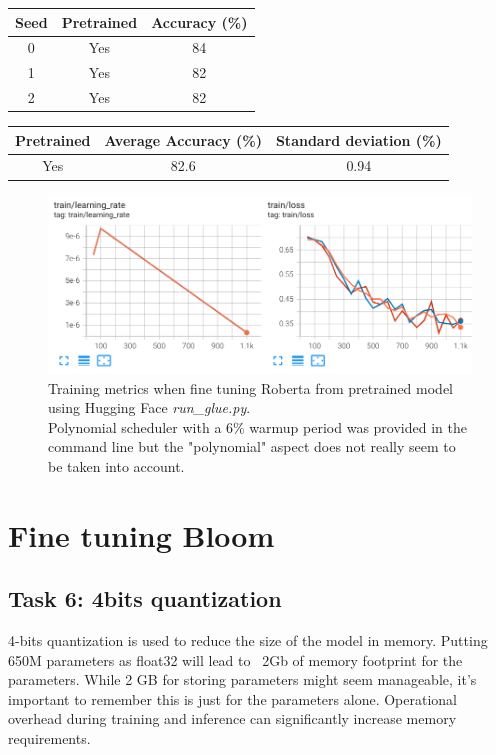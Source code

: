 \documentclass[a4paper]{article}
\begin{document}
\begin{center}
    \begin{tabular}{||c c c |} 
     \hline
     Seed & Pretrained & Accuracy (\%) \\ [0.5ex] 
     \hline\hline
     0 & Yes & 84 \\
     \hline
     1 & Yes & 82  \\
     \hline
     2 & Yes & 82  \\ 
     \hline
    \end{tabular}
\end{center}

\begin{center}
    \begin{tabular}{||c c c |} 
     \hline
     Pretrained & Average Accuracy (\%)  & Standard deviation  (\%)\\ [0.5ex] 
     \hline\hline
     Yes & 82.6  & 0.94\\ 
     \hline
    \end{tabular}
\end{center}

\begin{figure}[ht]
    \centering
    \includegraphics[width=.8\textwidth]{figures/training_evolution_roberta_hugging_face.png}
    \caption{Training metrics when fine tuning Roberta from pretrained model using Hugging Face \textit{run\_glue.py}. \\
    Polynomial scheduler with a 6\% warmup period was provided in the command line but the "polynomial" aspect does not really seem to be taken into account.}
    \label{fig:roberta_hf_train}
\end{figure}
\break
\section{Fine tuning Bloom}
\subsection*{Task 6: 4bits quantization}
4-bits quantization is used to reduce the size of the model in memory.
Putting 650M parameters as float32 will lead to ~2Gb of memory footprint for the parameters.
While 2 GB for storing parameters might seem manageable, it's important to remember this is just for the parameters alone.
Operational overhead during training and inference can significantly increase memory requirements.
\end{document}

